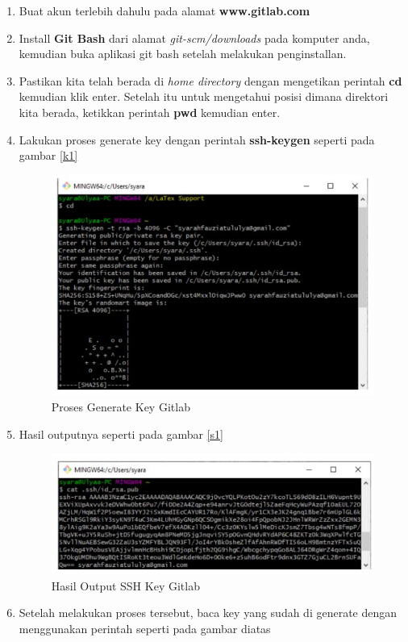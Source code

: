 \begin{enumerate}
\item Buat akun terlebih dahulu pada alamat \textbf{www.gitlab.com}
\item Install \textbf{Git Bash} dari alamat \textit{git-scm/downloads} pada komputer anda, kemudian buka aplikasi git bash setelah melakukan penginstallan.
\item Pastikan kita telah berada di \textit{home directory} dengan mengetikan perintah \textbf{cd} kemudian klik enter. Setelah itu untuk mengetahui posisi dimana direktori kita berada, ketikkan perintah \textbf{pwd} kemudian enter.
\item Lakukan proses generate key dengan perintah \textbf{ssh-keygen} seperti pada gambar \ref{k1}
\subitem 
\begin{figure}[!htbp]
\centerline{\includegraphics[width=.75\textwidth]{Figures/gitlab/SSH.JPG}}
\caption{Proses Generate Key Gitlab}
\label{fig:k1}
\end{figure}
\item Hasil outputnya seperti pada gambar \ref{s1}
\subitem
\begin{figure}[!htbp]
\centerline{\includegraphics[width=.75\textwidth]{Figures/gitlab/SSH2.JPG}}
\caption{Hasil Output SSH Key Gitlab}
\label{fig:s1}
\end{figure}
\item Setelah melakukan proses tersebut, baca key yang sudah di generate dengan menggunakan perintah seperti pada gambar diatas 

\end{enumerate}
